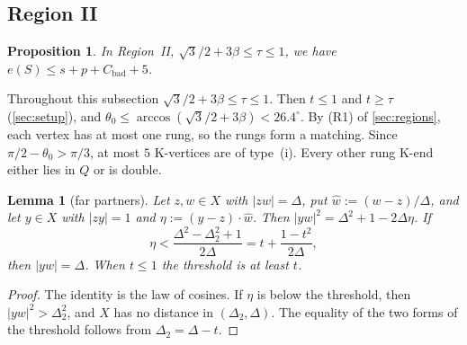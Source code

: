 \documentclass[11pt]{amsart}
\newtheorem{lemma}[theorem]{Lemma}
\newtheorem{proposition}[theorem]{Proposition}
\theoremstyle{definition}
\theoremstyle{remark}
\newcommand{\Dt}{\Delta_2}
\begin{document}
\subsection{Region II}

\begin{proposition}\label{prop:regionII2}
In Region~II, $\sqrt3/2+3\beta\le\tau\le1$, we have $e(S)\le s+p+C_{\mathrm{bad}}+5$.
\end{proposition}

Throughout this subsection $\sqrt3/2+3\beta\le\tau\le1$. Then $t\le1$ and $t\ge\tau$ (\cref{sec:setup}), and $\theta_0\le\arccos(\sqrt3/2+3\beta)<26.4^\circ$. By (R1) of \cref{sec:regions}, each vertex has at most one rung, so the rungs form a matching. Since $\pi/2-\theta_0>\pi/3$, at most $5$ K-vertices are of type~(i). Every other rung K-end either lies in $Q$ or is double.

\begin{lemma}[far partners]\label{lem:farpartner}
Let $z,w\in X$ with $|zw|=\Delta$, put $\hat w:=(w-z)/\Delta$, and let $y\in X$ with $|zy|=1$ and $\eta:=(y-z)\cdot\hat w$. Then $|yw|^2=\Delta^2+1-2\Delta\eta$. If
\[
\eta<\frac{\Delta^2-\Dt^2+1}{2\Delta}=t+\frac{1-t^2}{2\Delta},
\]
then $|yw|=\Delta$. When $t\le1$ the threshold is at least $t$.
\end{lemma}
\begin{proof}
The identity is the law of cosines. If $\eta$ is below the threshold, then $|yw|^2>\Dt^2$, and $X$ has no distance in $(\Dt,\Delta)$. The equality of the two forms of the threshold follows from $\Dt=\Delta-t$.
\end{proof}
\end{document}
